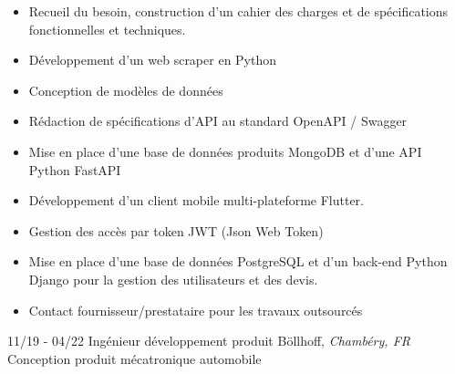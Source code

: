 \documentclass[]{friggeri-cv}
\begin{document}
\vspace{0.5mm}
\begin{itemize}
\setlength{\itemsep}{1pt}
\setlength{\parskip}{0pt}
\setlength{\parsep}{0pt}

\item Recueil du besoin, construction d'un cahier des charges et de spécifications fonctionnelles et techniques.
\item Développement d'un web scraper en Python
\item Conception de modèles de données
\item Rédaction de spécifications d'API au standard OpenAPI / Swagger
\item Mise en place d'une base de données produits MongoDB et d'une API Python FastAPI
\item Développement d'un client mobile multi-plateforme Flutter.
\item Gestion des accès par token JWT (Json Web Token)
\item Mise en place d'une base de données PostgreSQL et d'un back-end Python Django pour la gestion des utilisateurs et des devis.
\item Contact fournisseur/prestataire pour les travaux outsourcés
\end{itemize}

\begin{entrylist}
  \entry
    {11/19 - 04/22}
    {Ingénieur développement produit}
    {Böllhoff, \textit{Chambéry, FR}}
    {Conception produit mécatronique automobile}
\end{entrylist}
\vspace{-15pt}
\end{document}
